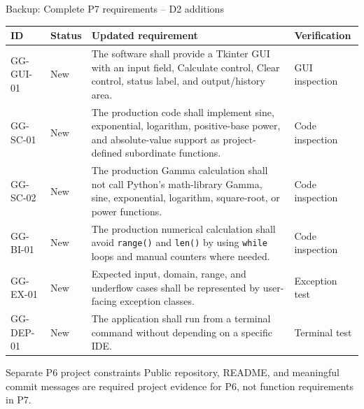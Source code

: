 \documentclass[10pt,aspectratio=169]{beamer}
\newcommand{\smallnote}[1]{\vspace{0.2em}{\scriptsize\textcolor{linegray}{#1}}}
\newcommand{\statusnew}{\textcolor{softgreen}{New}}
\begin{document}
\begin{frame}{Backup: Complete P7 requirements -- D2 additions}
\tiny
\renewcommand{\arraystretch}{1.12}
\begin{tabularx}{\textwidth}{>{\ttfamily}p{1.4cm}p{1.25cm}X p{1.55cm}}
\toprule
ID & Status & Updated requirement & Verification \\
\midrule
GG-GUI-01 & \statusnew & The software shall provide a Tkinter GUI with an input field, Calculate control, Clear control, status label, and output/history area. & GUI inspection \\
GG-SC-01 & \statusnew & The production code shall implement sine, exponential, logarithm, positive-base power, and absolute-value support as project-defined subordinate functions. & Code inspection \\
GG-SC-02 & \statusnew & The production Gamma calculation shall not call Python's math-library Gamma, sine, exponential, logarithm, square-root, or power functions. & Code inspection \\
GG-BI-01 & \statusnew & The production numerical calculation shall avoid \texttt{range()} and \texttt{len()} by using \texttt{while} loops and manual counters where needed. & Code inspection \\
GG-EX-01 & \statusnew & Expected input, domain, range, and underflow cases shall be represented by user-facing exception classes. & Exception test \\
GG-DEP-01 & \statusnew & The application shall run from a terminal command without depending on a specific IDE. & Terminal test \\
\bottomrule
\end{tabularx}
\vspace{0.45em}
\begin{block}{Separate P6 project constraints}
\scriptsize
Public repository, README, and meaningful commit messages are required project evidence for P6, not function requirements in P7.
\end{block}
\vfill\smallnote{Sources: [1], [2].}
\end{frame}
\end{document}
